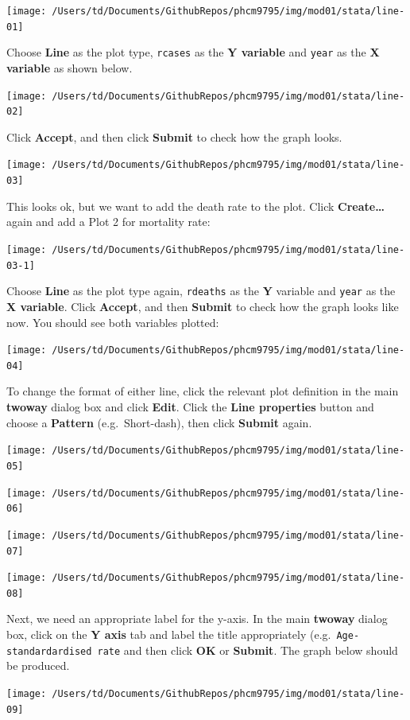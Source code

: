 \documentclass[
]{memoir}
\begin{document}
\texttt{[image: /Users/td/Documents/GithubRepos/phcm9795/img/mod01/stata/line-01]}

Choose \textbf{Line} as the plot type, \texttt{rcases} as the \textbf{Y variable} and \texttt{year} as the \textbf{X variable} as shown below.

\texttt{[image: /Users/td/Documents/GithubRepos/phcm9795/img/mod01/stata/line-02]}

Click \textbf{Accept}, and then click \textbf{Submit} to check how the graph looks.

\texttt{[image: /Users/td/Documents/GithubRepos/phcm9795/img/mod01/stata/line-03]}

This looks ok, but we want to add the death rate to the plot. Click \textbf{Create\ldots{}} again and add a Plot 2 for mortality rate:

\texttt{[image: /Users/td/Documents/GithubRepos/phcm9795/img/mod01/stata/line-03-1]}

Choose \textbf{Line} as the plot type again, \texttt{rdeaths} as the \textbf{Y} variable and \texttt{year} as the \textbf{X variable}. Click \textbf{Accept}, and then \textbf{Submit} to check how the graph looks like now. You should see both variables plotted:

\texttt{[image: /Users/td/Documents/GithubRepos/phcm9795/img/mod01/stata/line-04]}

To change the format of either line, click the relevant plot definition in the main \textbf{twoway} dialog box and click \textbf{Edit}. Click the \textbf{Line properties} button and choose a \textbf{Pattern} (e.g.~Short-dash), then click \textbf{Submit} again.

\texttt{[image: /Users/td/Documents/GithubRepos/phcm9795/img/mod01/stata/line-05]}

\texttt{[image: /Users/td/Documents/GithubRepos/phcm9795/img/mod01/stata/line-06]}

\texttt{[image: /Users/td/Documents/GithubRepos/phcm9795/img/mod01/stata/line-07]}

\texttt{[image: /Users/td/Documents/GithubRepos/phcm9795/img/mod01/stata/line-08]}

Next, we need an appropriate label for the y-axis. In the main \textbf{twoway} dialog box, click on the \textbf{Y axis} tab and label the title appropriately (e.g.~\texttt{Age-standardardised\ rate} and then click \textbf{OK} or \textbf{Submit}. The graph below should be produced.

\texttt{[image: /Users/td/Documents/GithubRepos/phcm9795/img/mod01/stata/line-09]}
\end{document}
